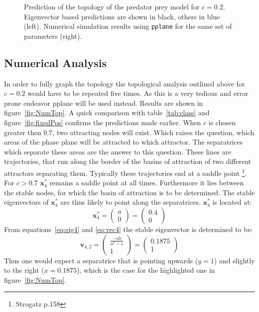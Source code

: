 \begin{figure}
\centering


\caption{Prediction of the topology of the predator prey model for $c = 0.2$. Eigenvector based predictions are shown in black, others in blue (left). Numerical simulation results using \texttt{pplane} for the same set of parameters (right).}
\label{fig:Top}
\end{figure}

\subsection{Numerical Analysis}
In order to fully graph the topology the topological analysis outlined above for $c = 0.2$ would have to be repeated five times. As this is a very tedious and error prone endeavor pplane will be used instead. Results are shown in figure~\ref{fig:NumTop}. A quick comparison with table~\ref{tab:class} and figure~\ref{fig:fixedPos} confirms the predictions made earlier. When $c$ is chosen greater then $0.7$, two attracting nodes will exist. Which raises the question, which areas of the phase plane will be attracted to which attractor. The separatrices which separate these areas are the answer to this question. These lines are trajectories, that run along the border of the basins of attraction of two different attractors separating them. Typically these trajectories end at a saddle point \footnote{Strogatz p.158}. For $c > 0.7$ $\mathbf{x}_4^*$ remains a saddle point at all times. Furthermore it lies between the stable nodes, for which the basin of attraction is to be determined. The stable eigenvectors of $\mathbf{x}_4^*$ are thus likely to point along the separatrices. $\mathbf{x}_4^*$ is located at:
\begin{equation}
\mathbf{x}_4^* = \begin{pmatrix} a \\ 0
\end{pmatrix} = \begin{pmatrix} 0.4 \\ 0
\end{pmatrix}
\end{equation}
From equations~\ref{eq:eig4} and \ref{eq:vec4} the stable eigenvector is determined to be:
\begin{equation}
\mathbf{v}_{4,2} = \begin{pmatrix}
\frac{-ab}{a^2-c} \\ 1
\end{pmatrix} 
= \begin{pmatrix}
0.1875 \\ 1
\end{pmatrix} 
\end{equation}
Thus one would expect a separatrice that is pointing upwards ($y = 1$) and slightly to the right ($x = 0.1875$), which is the case for the highlighted one in figure~\ref{fig:NumTop}. 


